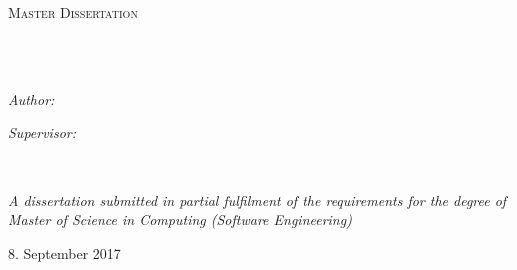 \documentclass[
11pt, %
english, %
singlespacing, %
headsepline, %
oneside,
]{MastersDoctoralThesis} %
\author{Alvaro \textsc{Ortiz Troncoso}} %
\begin{document}
\frontmatter %

\pagestyle{plain} %


\begin{titlepage}
\begin{center}

\vspace*{.06\textheight}
{\scshape\LARGE \univname\par}\vspace{1.5cm} %
\textsc{\Large Master Dissertation}\\[0.5cm] %

\HRule \\[0.4cm] %
{\huge \bfseries \ttitle\par}\vspace{0.4cm} %
\HRule \\[1.5cm] %
 
\begin{minipage}[t]{0.4\textwidth}
\begin{flushleft} \large
\emph{Author:}\\
{\authorname} %
\end{flushleft}
\end{minipage}
\begin{minipage}[t]{0.4\textwidth}
\begin{flushright} \large
\emph{Supervisor:} \\
{\supname} %
\end{flushright}
\end{minipage}\\[3cm]
 
\vfill

\large \textit{A dissertation submitted in partial fulfilment 
of the requirements for the degree of \\
Master of Science in Computing (Software Engineering)}\\[0.3cm] %
 
\vfill

{\large 8. September 2017}\\[4cm] %
 
\vfill
\end{center}
\end{titlepage}
\end{document}
